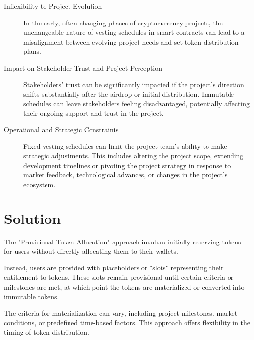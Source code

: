 \documentclass[12pt,oneside]{article}
\begin{document}
\begin{description}
  \item[Inflexibility to Project Evolution]
  In the early, often changing phases of cryptocurrency projects, the unchangeable nature
   of vesting schedules in smart contracts can 
  lead to a misalignment between evolving project needs and set token distribution plans.

  \item[Impact on Stakeholder Trust and Project Perception]
  Stakeholders' trust can be significantly impacted if the project's direction shifts 
  substantially after the airdrop or initial distribution. Immutable schedules can
  leave stakeholders feeling disadvantaged, potentially affecting their ongoing
  support and trust in the project.

  \item[Operational and Strategic Constraints]
  Fixed vesting schedules can limit the project team's ability to make 
  strategic adjustments. This includes altering the project scope, 
  extending development timelines or pivoting the project strategy 
  in response to market feedback, technological advances, or 
  changes in the project's ecosystem.
\end{description}


\section{Solution}

The "Provisional Token Allocation" approach involves initially reserving tokens 
for users without directly allocating them to their wallets. 

Instead, users are provided with placeholders or "slots" representing their entitlement to tokens. 
These slots remain provisional until certain criteria or milestones are met, at which point 
the tokens are materialized or converted into immutable tokens. 

The criteria for materialization 
can vary, including project milestones, market conditions, or predefined time-based factors. 
This approach offers flexibility in the timing of token distribution.
\end{document}

